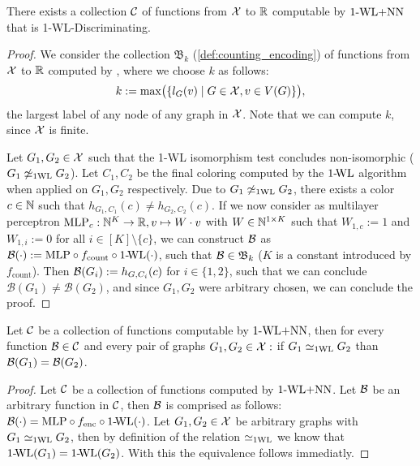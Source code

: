 \begin{lemma}\label{lem:wl_disc_exists}
    There exists a collection $\mathcal{C}$ of functions from $\mathcal{X}$ to $\mathbb{R}$ computable by $\text{1-WL+NN}$ that is 1-\!WL-Discriminating.
\end{lemma}
\begin{proof}
We consider the collection $\mathfrak{B}_k$ (\cref{def:counting_encoding}) of functions from $\mathcal{X}$ to $\mathbb{R}$ computed by \wlnn, where we choose $k$ as follows:
\begin{equation*}
    k := \max \bigl( \{ l_G(v) \mid G \in \mathcal{X}, v \in V(G)\} \bigr),
\end{equation*}
the largest label of any node of any graph in $\mathcal{X}$. Note that we can compute $k$, since $\mathcal{X}$ is finite.

Let $G_1, G_2 \in \mathcal{X}$ such that the 1-WL isomorphism test concludes non-isomorphic ($G_1 \not\simeq_{\text{1WL}} G_2$). Let $C_1, C_2$ be the final coloring computed by the $\text{1-\!WL}$ algorithm when applied on $G_1, G_2$ respectively.
Due to $G_1 \not\simeq_{\text{1WL}} G_2$, there exists a color $c \in \mathbb{N}$ such that $h_{G_1, C_1}(c) \neq h_{G_2, C_2}(c)$. If we now consider as multilayer perceptron $\text{MLP}_c: \mathbb{N}^K \rightarrow \mathbb{R}, v \mapsto W \cdot v$ with $W \in \mathbb{N}^{1 \times K}$ such that $W_{1,c} := 1$ and $W_{1,i} := 0$ for all $i \in [K] \setminus \{c\}$, we can construct $\mathcal{B}$ as $\mathcal{B}(\cdot) := \text{MLP} \circ f_{\text{count}} \circ \text{1-\!WL}(\cdot)$, such that $\mathcal{B} \in \mathfrak{B}_k$ ($K$ is a constant introduced by $f_\text{count}$). Then $\mathcal{B}(G_i) := h_{G, C_i}(c)$ for $i \in \{1, 2\}$, such that we can conclude $\mathcal{B}(G_1) \neq \mathcal{B}(G_2)$, and since $G_1,G_2$ were arbitrary chosen, we can conclude the proof.
\end{proof}

\begin{lemma}\label{lem:wl_relation_equivalence}
    Let $\mathcal{C}$ be a collection of functions computable by $\text{1-WL+NN}$, then for every function $\mathcal{B} \in \mathcal{C}$ and every pair of graphs $G_1, G_2 \in \mathcal{X}:$ if $G_1 \simeq_{\text{1WL}} G_2$ than $\mathcal{B}(G_1) = \mathcal{B}(G_2)$.
\end{lemma}

\begin{proof}
    Let $\mathcal{C}$ be a collection of functions computed by $\text{1-WL+NN}$. Let $\mathcal{B}$ be an arbitrary function in $\mathcal{C}$, then $\mathcal{B}$ is comprised as follows: $\mathcal{B}(\cdot) = \text{MLP} \circ f_{\text{enc}} \circ \text{1-\!WL}(\cdot)$. Let $G_1, G_2 \in \mathcal{X}$ be arbitrary graphs with $G_1 \simeq_{\text{1WL}} G_2$, then by definition of the relation $\simeq_{\text{1WL}}$ we know that $\text{1-\!WL}(G_1) = \text{1-\!WL}(G_2)$. With this the equivalence follows immediatly.
\end{proof}

